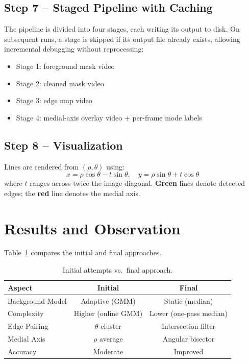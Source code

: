 \documentclass[conference, twocolumn]{IEEEtran}
\begin{document}
\subsection{Step 7 -- Staged Pipeline with Caching}

The pipeline is divided into four stages, each writing its output to disk. On subsequent runs, a stage is skipped if its output file already exists, allowing incremental debugging without reprocessing:
\begin{itemize}
    \item Stage 1: foreground mask video
    \item Stage 2: cleaned mask video
    \item Stage 3: edge map video
    \item Stage 4: medial-axis overlay video + per-frame mode labels
\end{itemize}

\subsection{Step 8 -- Visualization}

Lines are rendered from $(\rho, \theta)$ using:
\begin{equation}
    x = \rho\cos\theta - t\sin\theta, \quad y = \rho\sin\theta + t\cos\theta
\end{equation}
where $t$ ranges across twice the image diagonal. \textbf{Green} lines denote detected edges; the \textbf{red} line denotes the medial axis.

\section{Results and Observation}

Table~\ref{tab:comparison} compares the initial and final approaches.

\begin{table}[H]
\centering
\caption{Initial attempts vs.\ final approach.}
\label{tab:comparison}
\begin{tabular}{@{}lcc@{}}
\toprule
\textbf{Aspect} & \textbf{Initial} & \textbf{Final} \\
\midrule
Background Model  & Adaptive (GMM)     & Static (median)         \\
Complexity        & Higher (online GMM)& Lower (one-pass median) \\
Edge Pairing      & $\theta$-cluster   & Intersection filter     \\
Medial Axis       & $\rho$ average     & Angular bisector        \\
Accuracy          & Moderate           & Improved                \\
\bottomrule
\end{tabular}
\end{table}
\end{document}
